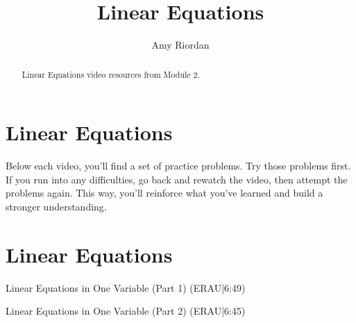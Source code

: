 \documentclass{ximera}
\title{Linear Equations}
\author{Amy Riordan}
\begin{document}
\begin{abstract}
Linear Equations video resources from Module 2.
\end{abstract}
\maketitle

\section*{Linear Equations}

Below each video, you’ll find a set of practice problems. Try those problems first. If you run into any difficulties, go back and rewatch the video, then attempt the problems again. This way, you’ll reinforce what you’ve learned and build a stronger understanding.

\section*{Linear Equations}

Linear Equations in One Variable (Part 1) (ERAU|6:49)


Linear Equations in One Variable (Part 2) (ERAU|6:45)

\end{document}

